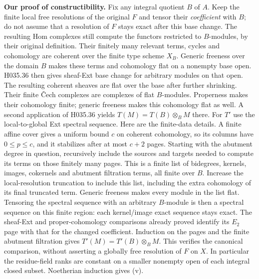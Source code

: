 \textbf{Our proof of constructibility.} Fix any integral quotient
$B$ of $A$. Keep the finite local free resolutions of the original
$F$ and tensor their \emph{coefficient} with $B$; do not assume that
a resolution of $F$ stays exact after this base change. The resulting
Hom complexes still compute the functors restricted to $B$-modules,
by their original definition. Their finitely many relevant terms,
cycles and cohomology are coherent over the finite type scheme $X_B$.
Generic freeness over the domain $B$ makes these terms and
cohomology flat on a nonempty base open. H035.36 then gives
sheaf-Ext base change for arbitrary modules on that open. The
resulting coherent sheaves are flat over the base after further
shrinking. Their finite Čech complexes are complexes of flat
$B$-modules. Properness makes their cohomology finite; generic
freeness makes this cohomology flat as well. A second application
of H035.36 yields $T(M)=T(B)\otimes_B M$ there. For $T'$ use the
local-to-global Ext spectral sequence. Here are the finite-data details.
A finite affine cover gives a uniform bound $c$ on coherent cohomology,
so its columns have $0\leq p\leq c$, and it stabilizes after at most
$c+2$ pages. Starting with the abutment degree in question, recursively
include the sources and targets needed to compute its terms on those
finitely many pages. This is a finite list of bidegrees, kernels,
images, cokernels and abutment filtration terms, all finite over $B$.
Increase the local-resolution truncation to include this list, including
the extra cohomology of its final truncated term. Generic freeness
makes every module in the list flat. Tensoring the spectral sequence
with an arbitrary $B$-module is then a spectral sequence on this
finite region: each kernel/image exact sequence stays exact. The
sheaf-Ext and proper-cohomology comparisons already proved identify
its $E_2$ page with that for the changed coefficient. Induction on
the pages and the finite abutment filtration gives
$T'(M)=T'(B)\otimes_B M$. This verifies the canonical comparison,
without asserting a globally free resolution of $F$ on $X$.
In particular the residue-field ranks are constant on a smaller
nonempty open of each integral closed subset. Noetherian induction
gives (v).

